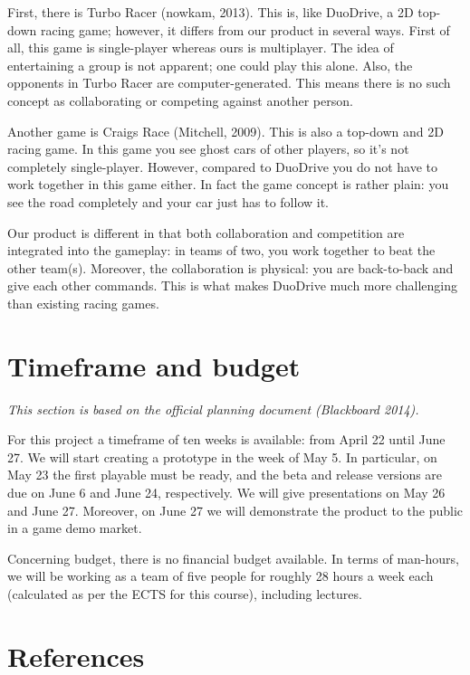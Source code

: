 \documentclass[11pt,twoside,a4paper]{article}
\begin{document}
First, there is Turbo Racer (nowkam, 2013). This is, like DuoDrive, a 2D top-down racing game; however, it differs from our product in several ways. First of all, this game is single-player whereas ours is multiplayer. The idea of entertaining a group is not apparent; one could play this alone. Also, the opponents in Turbo Racer are computer-generated. This means there is no such concept as collaborating or competing against another person.

Another game is Craigs Race (Mitchell, 2009). This is also a top-down and 2D racing game. In this game you see ghost cars of other players, so it's not completely single-player. However, compared to DuoDrive you do not have to work together in this game either. In fact the game concept is rather plain: you see the road completely and your car just has to follow it.

Our product is different in that both collaboration and competition are integrated into the gameplay: in teams of two, you work together to beat the other team(s). Moreover, the collaboration is physical: you are back-to-back and give each other commands. This is what makes DuoDrive much more challenging than existing racing games.


\section{Timeframe and budget}
{\itshape This section is based on the official planning document (Blackboard 2014).}

For this project a timeframe of ten weeks is available: from April 22 until June 27. We will start creating a prototype in the week of May 5. In particular, on May 23 the first playable must be ready, and the beta and release versions are due on June 6 and June 24, respectively. We will give presentations on May 26 and June 27. Moreover, on June 27 we will demonstrate the product to the public in a game demo market.

Concerning budget, there is no financial budget available. In terms of man-hours, we will be working as a team of five people for roughly 28 hours a week each (calculated as per the ECTS for this course), including lectures.


\clearpage

\section*{References}
\end{document}
